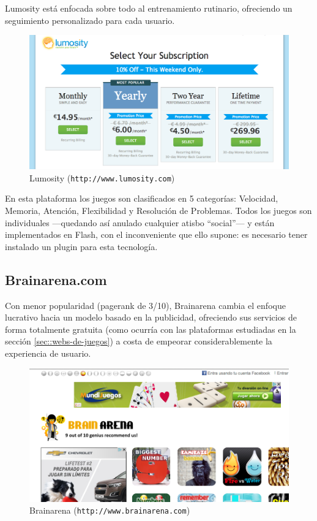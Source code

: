 Lumosity está enfocada sobre todo al entrenamiento rutinario, ofreciendo un seguimiento personalizado para cada usuario.

\begin{figure}[h]
  \begin{center}
    \includegraphics[width=\textwidth]{images/lumosity.png}
    \caption{Lumosity ({\tt http://www.lumosity.com})}
    \label{fig::lumosity}
  \end{center}
\end{figure}

En esta plataforma los juegos son clasificados en 5 categorías: Velocidad, Memoria, Atención, Flexibilidad y Resolución de Problemas. Todos los juegos son individuales ---quedando así anulado cualquier atisbo ``social''--- y están implementados en Flash, con el inconveniente que ello supone: es necesario tener instalado un plugin para esta tecnología.

\subsection*{Brainarena.com}

Con menor popularidad (pagerank de 3/10), Brainarena cambia el enfoque lucrativo hacia un modelo basado en la publicidad, ofreciendo sus servicios de forma totalmente gratuita (como ocurría con las plataformas estudiadas en la sección \ref{sec::webs-de-juegos}) a costa de empeorar considerablemente la experiencia de usuario.

\begin{figure}[h]
  \begin{center}
    \includegraphics[width=\textwidth]{images/brainarena.png}
    \caption{Brainarena ({\tt http://www.brainarena.com})}
    \label{fig::brainarena}
  \end{center}
\end{figure}


